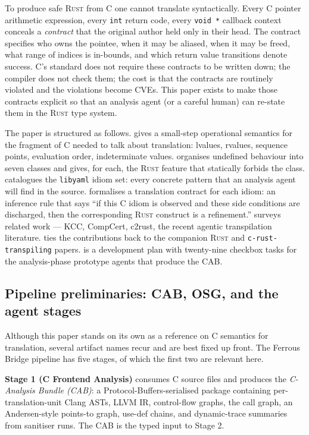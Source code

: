 \documentclass[12pt]{article}
\newcommand{\rust}{\textnormal{\textsc{Rust}}}
\newcommand{\clang}{\textnormal{\textsc{C}}}
\newcommand{\libyaml}{\texttt{libyaml}}
\theoremstyle{definition}
\theoremstyle{remark}
\begin{document}
To produce safe \rust{} from \clang{} one cannot translate syntactically. Every \clang{} pointer arithmetic expression, every \texttt{int} return code, every \texttt{void *} callback context conceals a \emph{contract} that the original author held only in their head. The contract specifies who owns the pointee, when it may be aliased, when it may be freed, what range of indices is in-bounds, and which return value transitions denote success. C's standard does not require these contracts to be written down; the compiler does not check them; the cost is that the contracts are routinely violated and the violations become CVEs. This paper exists to make those contracts explicit so that an analysis agent (or a careful human) can re-state them in the \rust{} type system.

The paper is structured as follows.  gives a small-step operational semantics for the fragment of \clang{} needed to talk about translation: lvalues, rvalues, sequence points, evaluation order, indeterminate values.  organises undefined behaviour into seven classes and gives, for each, the \rust{} feature that statically forbids the class.  catalogues the \libyaml{} idiom set: every concrete pattern that an analysis agent will find in the source.  formalises a translation contract for each idiom: an inference rule that says ``if this \clang{} idiom is observed and these side conditions are discharged, then the corresponding \rust{} construct is a refinement.''  surveys related work --- KCC, CompCert, c2rust, the recent agentic transpilation literature.  ties the contributions back to the companion \rust{} and \texttt{c-rust-transpiling} papers.  is a development plan with twenty-nine checkbox tasks for the analysis-phase prototype agents that produce the CAB.

\subsection{Pipeline preliminaries: CAB, OSG, and the agent stages}
\label{sec:preliminaries}

Although this paper stands on its own as a reference on \clang{} semantics for translation, several artifact names recur and are best fixed up front. The Ferrous Bridge pipeline has five stages, of which the first two are relevant here.

\textbf{Stage 1 (C Frontend Analysis)} consumes \clang{} source files and produces the \emph{C-Analysis Bundle (CAB)}: a Protocol-Buffers-serialised package containing per-translation-unit Clang ASTs, LLVM IR, control-flow graphs, the call graph, an Andersen-style points-to graph, use-def chains, and dynamic-trace summaries from sanitiser runs. The CAB is the typed input to Stage 2.
\end{document}
